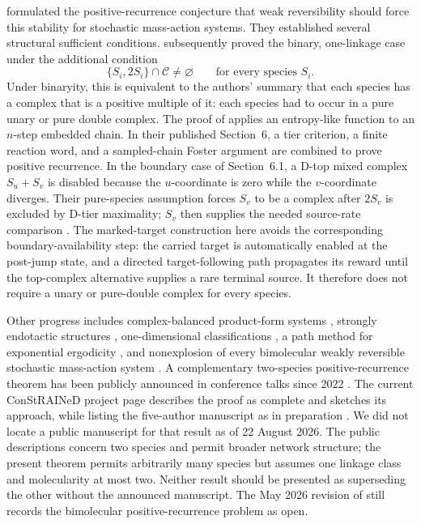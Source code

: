 \citet{AndersonKim2018} formulated the positive-recurrence conjecture that
weak reversibility should force this stability for stochastic mass-action
systems.  They established several structural sufficient conditions.
\citet{AndersonCappellettiKim2020} subsequently proved the binary,
one-linkage case under the additional condition
\begin{equation}\label{eq:ACK-condition}
  \{S_i,2S_i\}\cap\mathcal C\ne\varnothing
  \qquad\text{for every species }S_i.
\end{equation}
Under binaryity, this is equivalent to the authors' summary that each species
has a complex that is a positive multiple of it: each species had to occur in
a pure unary or pure double complex.  The
proof of \citet{AndersonCappellettiKim2020} applies an entropy-like function
to an \(n\)-step embedded chain.  In their published Section~6, a tier
criterion, a finite reaction word, and a sampled-chain Foster argument are
combined to prove positive recurrence.  In the boundary case of
Section~6.1, a D-top mixed complex \(S_u+S_v\) is disabled because the
\(u\)-coordinate is zero while the \(v\)-coordinate diverges.  Their
pure-species assumption forces \(S_v\) to be a complex after \(2S_v\) is
excluded by D-tier maximality; \(S_v\) then supplies the needed source-rate
comparison \citep[Section~6, especially Section~6.1]{AndersonCappellettiKim2020}.
The marked-target construction here avoids the corresponding
boundary-availability step: the carried target is automatically enabled at
the post-jump state, and a directed target-following path propagates its
reward until the top-complex alternative supplies a rare terminal source.  It
therefore does not require a unary or pure-double complex for every species.

Other progress includes complex-balanced product-form systems
\citep{AndersonCraciunKurtz2010}, strongly endotactic structures
\citep{AndersonCappellettiKimNguyen2020}, one-dimensional classifications
\citep{WiufXu2023}, a path method for exponential ergodicity
\citep{AndersonCappellettiFanKim2025}, and nonexplosion of every bimolecular
weakly reversible stochastic mass-action system \citep{Xu2026}.  A complementary two-species
positive-recurrence theorem has been publicly announced in conference talks
since 2022
\citep{Agazzi2022Talk,Cappelletti2022Talk,Agazzi2025Talk}.  The current ConStRAINeD
project page describes the proof as complete and sketches its approach, while
listing the five-author manuscript as in preparation
\citep{ConStRAINeDResults}.  We did not locate a public manuscript for that
result as of 22 August 2026.  The public descriptions concern two species and
permit broader network structure; the present theorem permits arbitrarily many
species but assumes one linkage class and molecularity at most two.  Neither
result should be presented as superseding the other without the announced
manuscript.  The May 2026
revision of \citet{Xu2026} still records the bimolecular positive-recurrence
problem as open.

